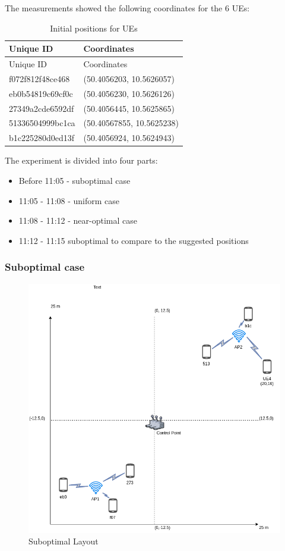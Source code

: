 The measurements showed the following coordinates for the 6 UEs:

\begin{longtable}[]{@{}ll@{}}
\caption{Initial positions for UEs}\tabularnewline
\toprule
Unique ID & Coordinates\tabularnewline
\midrule
\endfirsthead
\toprule
Unique ID & Coordinates\tabularnewline
\midrule
\endhead
f072f812f48ce468 & (50.4056203, 10.5626057)\tabularnewline
eb0b54819c69cf0c & (50.4056230, 10.5626126)\tabularnewline
27349a2cde6592df & (50.4056445, 10.5625865)\tabularnewline
51336504999bc1ca & (50.40567855, 10.5625238)\tabularnewline
b1c225280d0ed13f & (50.4056924, 10.5624943)\tabularnewline
\bottomrule
\end{longtable}

The experiment is divided into four parts:

\begin{itemize}
\tightlist
\item
  Before 11:05 - suboptimal case
\item
  11:05 - 11:08 - uniform case
\item
  11:08 - 11:12 - near-optimal case
\item
  11:12 - 11:15 suboptimal to compare to the suggested positions
\end{itemize}

\hypertarget{suboptimal-case}{%
\subsubsection{Suboptimal case}\label{suboptimal-case}}

\begin{figure}[H]
	\centering
	\includegraphics[width=\linewidth,keepaspectratio]{images/05-cases-description-Exp4-Suboptimal.png}
\caption{Suboptimal Layout}
\end{figure}

